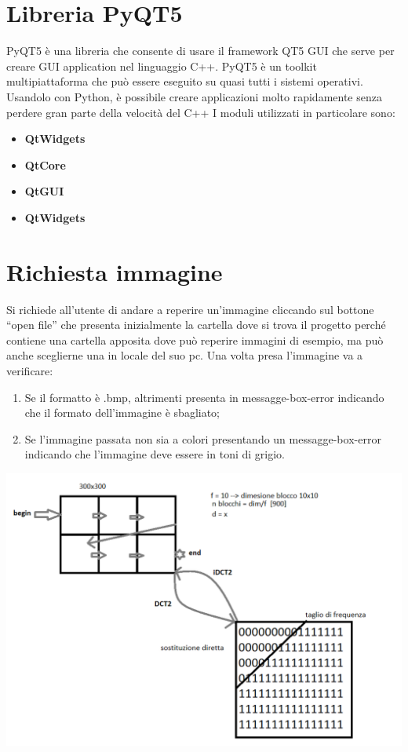 \documentclass[12pt]{article}
\begin{document}
\section{Libreria PyQT5}

PyQT5 è una libreria che consente di usare il framework QT5 GUI che serve per creare GUI application nel linguaggio C++.\newline
PyQT5 è un toolkit multipiattaforma che può essere eseguito su quasi tutti i sistemi operativi.\newline
Usandolo con Python, è possibile creare applicazioni molto rapidamente senza perdere gran parte della velocità del C++\newline
I moduli utilizzati in particolare sono:
	\begin{itemize}
		\item\textbf{QtWidgets}
	 	\item\textbf{QtCore}
	 	\item\textbf{QtGUI}
	 	\item\textbf{QtWidgets}
	\end{itemize}

\section{Richiesta immagine}

	Si richiede all’utente di andare a reperire un’immagine cliccando sul bottone “open file” che presenta inizialmente la cartella dove si trova il progetto perché contiene una cartella apposita  dove può reperire immagini di esempio, ma può anche sceglierne una in locale del suo pc.\newline
	Una volta presa l’immagine va a verificare:
	\begin{enumerate}
		\item Se il formatto è .bmp, altrimenti presenta in messagge-box-error indicando che il formato dell’immagine è sbagliato;
		\item Se l’immagine passata non sia a colori presentando un messagge-box-error indicando che l’immagine deve essere in toni di grigio.
	\end{enumerate}
	\includegraphics{immagine}
\end{document}
